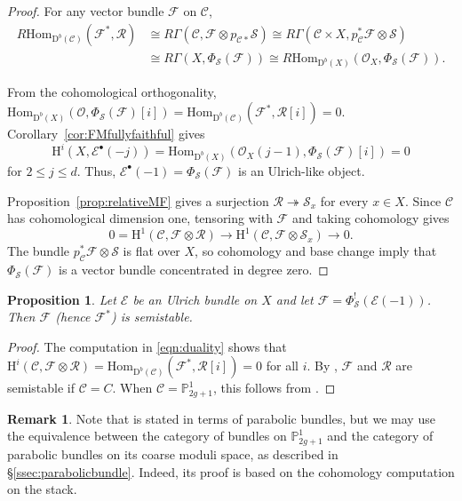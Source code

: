 \documentclass[12pt, letterpaper]{amsart}
\newtheorem{proposition}[theorem]{Proposition}
\theoremstyle{definition}
\newtheorem{remark}[theorem]{Remark}
\newcommand{\PP}{\mathbb{P} }
\newcommand{\cC}{\mathcal{C} }
\newcommand{\cE}{\mathcal{E} }
\newcommand{\cF}{\mathcal{F} }
\newcommand{\cO}{\mathcal{O} }
\newcommand{\cR}{\mathcal{R} }
\newcommand{\cS}{\mathcal{S} }
\newcommand{\rD}{\mathrm{D} }
\newcommand{\rH}{\mathrm{H} }
\def\rHom{\mathrm{Hom} }
\begin{document}
\begin{proof}
For any vector bundle \(\cF\) on \(\cC\),
\begin{equation}\label{eqn:duality}
\begin{split}
R\rHom_{\rD^b(\cC)}(\cF^*, \cR) &\cong R\Gamma(\cC, \cF \otimes p_{\cC*}\cS) \cong R\Gamma(\cC \times X, p_{\cC}^*\cF \otimes \cS)\\
&\cong R\Gamma(X, \Phi_{\cS}(\cF)) \cong R\rHom_{\rD^b(X)}(\cO_X, \Phi_{\cS}(\cF)).
\end{split}
\end{equation}

From the cohomological orthogonality, \(\rHom_{\rD^b(X)}(\cO, \Phi_{\cS}(\cF)[i]) = \rHom_{\rD^b(\cC)}(\cF^*, \cR[i]) = 0\). Corollary~\ref{cor:FMfullyfaithful} gives
\[\rH^i(X, \cE^\bullet (-j)) = \rHom_{\rD^b(X)}(\cO_X(j-1), \Phi_{\cS}(\cF)[i]) = 0\]
for \(2 \le j \le d\). Thus, \(\cE^\bullet (-1) = \Phi_{\cS}(\cF)\) is an Ulrich-like object.

Proposition~\ref{prop:relativeMF} gives a surjection \(\cR\twoheadrightarrow\cS_x\) for every \(x\in X\). Since \(\cC\) has cohomological dimension one, tensoring with \(\cF\) and taking cohomology gives
\[0=\rH^1(\cC,\cF\otimes\cR)\longrightarrow\rH^1(\cC,\cF\otimes\cS_x)\longrightarrow0.\]
The bundle \(p_{\cC}^*\cF\otimes\cS\) is flat over \(X\), so cohomology and base change imply that \(\Phi_{\cS}(\cF)\) is a vector bundle concentrated in degree zero.
\end{proof}

\begin{proposition}\label{prop:Fissemistable}
Let \(\cE\) be an Ulrich bundle on \(X\) and let \(\cF = \Phi_{\cS}^!(\cE(-1))\). Then \(\cF\) (hence \(\cF^*\)) is semistable.
\end{proposition}

\begin{proof}
The computation in \eqref{eqn:duality} shows that \(\rH^i(\cC, \cF \otimes \cR) = \rHom_{\rD^b(\cC)}(\cF^*, \cR[i]) = 0\) for all \(i\). By \cite[Exercise~2.8]{Pop13}, \(\cF\) and \(\cR\) are semistable if \(\cC = C\). When \(\cC = \PP_{2g+1}^1\), this follows from \cite[Theorem~6.1]{BD11}.
\end{proof}

\begin{remark}
Note that \cite[Theorem~6.1]{BD11} is stated in terms of parabolic bundles, but we may use the equivalence between the category of bundles on \(\PP_{2g+1}^1\) and the category of parabolic bundles on its coarse moduli space, as described in \S\ref{ssec:parabolicbundle}. Indeed, its proof is based on the cohomology computation on the stack.
\end{remark}
\end{document}

